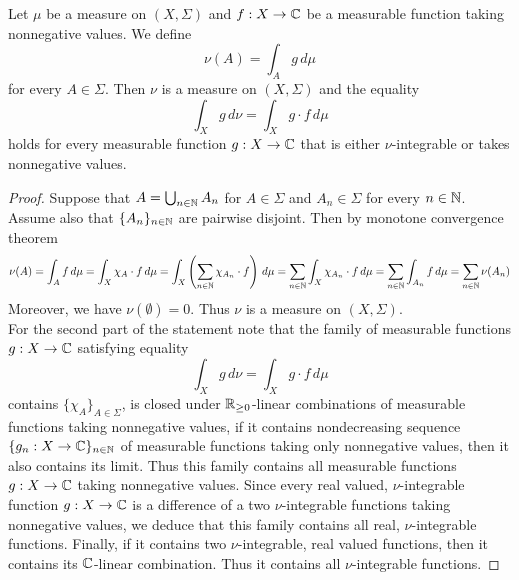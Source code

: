 \begin{proposition}\label{proposition:derivativeandintegration}
Let $\mu$ be a measure on $(X,\Sigma)$ and $f:X\rightarrow {\mathbb C}$ be a measurable function taking nonnegative values. We define
$$\nu(A) = \int_Ag\,d\mu$$
for every $A\in \Sigma$. Then $\nu$ is a measure on $(X,\Sigma)$ and the equality
$$\int_X g\,d\nu =\int_Xg\cdot f\,d\mu$$
holds for every measurable function $g:X\rightarrow {\mathbb C}$ that is either $\nu$-integrable or takes nonnegative values.
\end{proposition}
\begin{proof}
Suppose that $A = \bigcup_{n\in {\mathbb N}}A_n$ for $A\in \Sigma$ and $A_n\in \Sigma$ for every $n\in {\mathbb N}$. Assume also that $\{A_n\}_{n\in {\mathbb N}}$ are pairwise disjoint. Then by monotone convergence theorem
$$\nu(A) = \int_A f\,d\mu = \int_X\chi_A\cdot f\,d\mu = \int_X\left(\sum_{n\in {\mathbb N}}\chi_{A_n}\cdot f\right)\,d\mu = \sum_{n\in {\mathbb N}}\int_X\chi_{A_n}\cdot f\,d\mu = \sum_{n\in {\mathbb N}}\int_{A_n}f\,d\mu = \sum_{n\in {\mathbb N}}\nu(A_n)$$
Moreover, we have $\nu(\emptyset) = 0$. Thus $\nu$ is a measure on $(X,\Sigma)$.\\
For the second part of the statement note that the family of measurable functions $g:X\rightarrow {\mathbb C}$ satisfying equality
$$\int_Xg\,d\nu = \int_Xg\cdot f\,d\mu$$
contains $\{\chi_A\}_{A\in \Sigma}$, is closed under ${\mathbb R}_{\geq 0}$-linear combinations of measurable functions taking nonnegative values, if it contains nondecreasing sequence $\{g_n:X\rightarrow {\mathbb C}\}_{n\in {\mathbb N}}$ of measurable functions taking only nonnegative values, then it also contains its limit. Thus this family contains all measurable functions $g:X\rightarrow {\mathbb C}$ taking nonnegative values. Since every real valued, $\nu$-integrable function $g:X\rightarrow {\mathbb C}$ is a difference of a two $\nu$-integrable functions taking nonnegative values, we deduce that this family contains all real, $\nu$-integrable functions. Finally, if it contains two $\nu$-integrable, real valued functions, then it contains its ${\mathbb C}$-linear combination. Thus it contains all $\nu$-integrable functions.
\end{proof}

